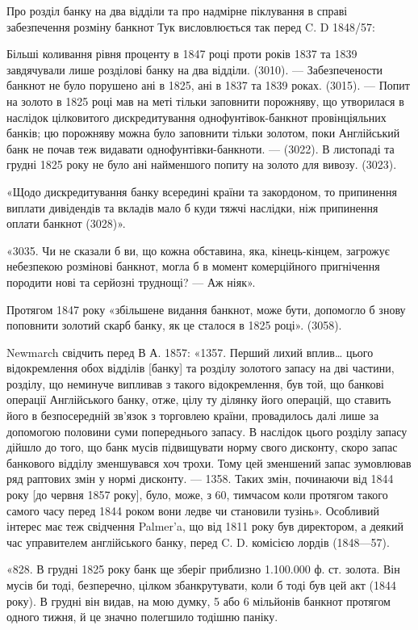 
Про розділ банку на два відділи та про надмірне піклування в справі забезпечення
розміну банкнот Тук висловлюється так перед C. D 1848/57:

Більші коливання рівня проценту в 1847 році проти років 1837 та 1839
завдячували лише розділові банку на два відділи. (3010). — Забезпечености банкнот
не було порушено ані в 1825, ані в 1837 та 1839 роках. (3015). — Попит
на золото в 1825 році мав на меті тільки заповнити порожняву, що утворилася
в наслідок цілковитого дискредитування однофунтівок-банкнот провінціяльних
банків; цю порожняву можна було заповнити тільки золотом, поки Англійський
банк не почав теж видавати однофунтівки-банкноти. — (3022). В листопаді та
грудні 1825 року не було ані найменшого попиту на золото для вивозу. (3023).

«Щодо дискредитування банку всередині країни та закордоном, то припинення
виплати дивідендів та вкладів мало б куди тяжчі наслідки, ніж припинення
оплати банкнот (3028)».

«3035. Чи не сказали б ви, що кожна обставина, яка, кінець-кінцем,
загрожує небезпекою розмінові банкнот, могла б в момент комерційного пригнічення
породити нові та серйозні труднощі? — Аж ніяк».

Протягом 1847 року «збільшене видання банкнот, може бути, допомогло б
знову поповнити золотий скарб банку, як це сталося в 1825 році». (3058).

Newmarch свідчить перед В А. 1857: «1357. Перший лихий вплив\dots{}
цього відокремлення обох відділів [банку] та розділу золотого запасу на дві частини,
розділу, що неминуче випливав з такого відокремлення, був той, що банкові
операції Англійського банку, отже, цілу ту ділянку його операцій, що ставить
його в безпосередній зв’язок з торговлею країни, провадилось далі лише за допомогою
половини суми попереднього запасу. В наслідок цього розділу запасу
дійшло до того, що банк мусів підвищувати норму свого дисконту, скоро запас
банкового відділу зменшувався хоч трохи. Тому цей зменшений запас зумовлював
ряд раптових змін у нормі дисконту. — 1358. Таких змін, починаючи від
1844 року [до червня 1857 року], було, може, з 60, тимчасом коли протягом
такого самого часу перед 1844 роком вони ледве чи становили тузінь». Особливий
інтерес має теж свідчення Palmer’a, що від 1811 року був директором, а
деякий час управителем англійського банку, перед C. D. комісією лордів (1848—57).

«828. В грудні 1825 року банк ще зберіг приблизно 1.100.000 ф. ст.
золота. Він мусів би тоді, безперечно, цілком збанкрутувати, коли б тоді був
цей акт (1844 року). В грудні він видав, на мою думку, 5 або 6 мільйонів
банкнот протягом одного тижня, й це значно полегшило тодішню паніку.

